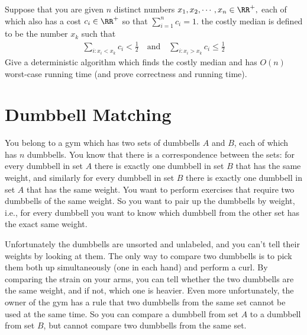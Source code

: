 \documentclass{article}
\begin{document}
Suppose that you are given $n$ distinct numbers $x_1, x_2, \cdots, x_n\in\RR^+,$ each of which also has a cost $c_i\in\RR^+$ so that $\sum_{i=1}^{n} c_i=1.$ the costly median is defined to be the number $x_k$ such that
\begin{align*}
	\sum_{i: x_i<x_k}^{} c_i<\frac{1}{2} \quad\text{and}\quad \sum_{i:x_i>x_k}^{}c_i\le\frac{1}{2}
\end{align*}
Give a deterministic algorithm which finds the costly median and has $O(n)$ worst-case running time (and prove correctness and running time).

\section{Dumbbell Matching}
You belong to a gym which has two sets of dumbbells $A$ and $B$, each of which has $n$ dumbbells.  You know that there is a correspondence between the sets: for every dumbbell in set $A$ there is exactly one dumbbell in set $B$ that has the same weight, and similarly for every dumbbell in set $B$ there is exactly one dumbbell in set $A$ that has the same weight.  You want to perform exercises that require two dumbbells of the same weight.  So you want to pair up the dumbbells by weight, i.e., for every dumbbell you want to know which dumbbell from the other set has the exact same weight.

Unfortunately the dumbbells are unsorted and unlabeled, and you can't tell their weights by looking at them. The only way to compare two dumbbells is to pick them both up simultaneously (one in each hand) and perform a curl.  By comparing the strain on your arms, you can tell whether the two dumbbells are the same weight, and if not, which one is heavier.  Even more unfortunately, the owner of the gym has a rule that two dumbbells from the same set cannot be used at the same time.  So you can compare a dumbbell from set $A$ to a dumbbell from set $B$, but cannot compare two dumbbells from the same set.  
\end{document}
